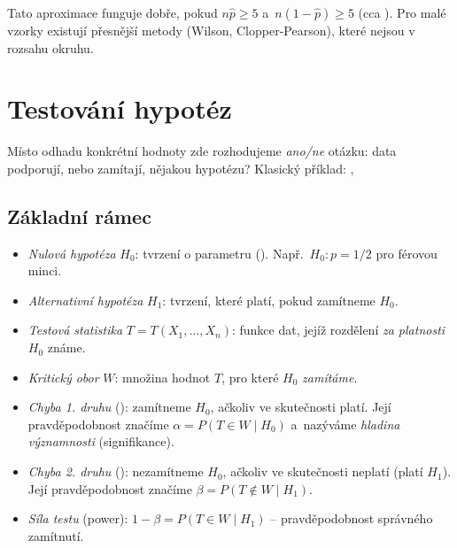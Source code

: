 \documentclass[11pt,a4paper]{article}
\begin{document}
\begin{poznamka}
Tato aproximace funguje dobře, pokud $n\hat p\ge 5$ a~$n(1-\hat p)\ge 5$ (cca ). Pro malé vzorky existují přesnější metody (Wilson, Clopper-Pearson), které nejsou v rozsahu okruhu.
\end{poznamka}

\section{Testování hypotéz}

Místo odhadu konkrétní hodnoty zde rozhodujeme \emph{ano/ne} otázku: data podporují, nebo zamítají, nějakou hypotézu? Klasický příklad: , 

\subsection{Základní rámec}

\begin{definice}
\leavevmode
\begin{itemize}
  \item \emph{Nulová hypotéza} $H_0$:  tvrzení o parametru (). Např.\ $H_0\colon p=1/2$ pro férovou minci.
  \item \emph{Alternativní hypotéza} $H_1$: tvrzení, které platí, pokud zamítneme $H_0$.
  \item \emph{Testová statistika} $T=T(X_1,\dots,X_n)$: funkce dat, jejíž rozdělení \emph{za platnosti $H_0$} známe.
  \item \emph{Kritický obor} $W$: množina hodnot $T$, pro které $H_0$ \emph{zamítáme}.
\end{itemize}
\end{definice}

\begin{definice}
\leavevmode
\begin{itemize}
  \item \emph{Chyba 1. druhu} (): zamítneme $H_0$, ačkoliv ve skutečnosti platí. Její pravděpodobnost značíme $\alpha=P(T\in W\mid H_0)$ a~nazýváme \emph{hladina významnosti} (signifikance).
  \item \emph{Chyba 2. druhu} (): nezamítneme $H_0$, ačkoliv ve skutečnosti neplatí (platí $H_1$). Její pravděpodobnost značíme $\beta=P(T\notin W\mid H_1)$.
  \item \emph{Síla testu} (power): $1-\beta=P(T\in W\mid H_1)$ -- pravděpodobnost správného zamítnutí.
\end{itemize}
\end{definice}
\end{document}
